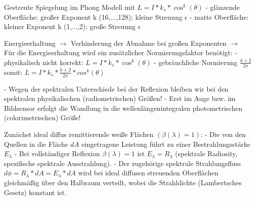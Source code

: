 \documentclass[10pt,landscape]{article}
\begin{document}
\begin{multicols}{3}
  
  Gestreute Spiegelung im Phong Modell mit $L=I*k_s*\cos^k(\theta)$
  - glänzende Oberfläche: großer Exponent k (16,...,128); kleine Streuung $\epsilon$
  - matte Oberfläche: kleiner Exponent k (1,...,2); große Streuung $\epsilon$
  
  Energieerhaltung $\rightarrow$ Verhinderung der Abnahme bei großen Exponenten $\rightarrow$ Für die Energieerhaltung wird ein zusätzlicher Normierungsfaktor benötigt:
  - physikalisch nicht korrekt:  $L=I*k_s*\cos^k(\theta)$
  - gebräuchliche Normierung $\frac{k+2}{2\pi}$ somit: $L=I*k_s*\frac{k+2}{2\pi}*cos^k(\theta)$
  
  - Wegen der spektralen Unterschiede bei der Reflexion bleiben wir bei den spektralen physikalischen (radiometrischen) Größen!
  - Erst im Auge bzw. im Bildsensor erfolgt die Wandlung in die wellenlängenintegralen photometrischen (colorimetrischen) Größe!
  
  Zunächst ideal diffus remittierende weiße Flächen $(\beta(\lambda) = 1)$:
  - Die von den Quellen in die Fläche $dA$ eingetragene Leistung führt zu einer Bestrahlungsstärke $E_{\lambda}$
  - Bei vollständiger Reflexion $\beta(\lambda) = 1$ ist $E_{\lambda} = R_{\lambda}$ (spektrale Radiosity, spezifische spektrale Ausstrahlung).
  - Der zugehörige spektrale Strahlungsfluss $d\phi = R_{\lambda} * dA = E_{\lambda} * dA$ wird bei ideal diffusen streuenden Oberflächen gleichmäßig über den Halbraum verteilt, wobei die Strahldichte (Lambertsches Gesetz) konstant ist.
  

\end{multicols}
\end{document}
